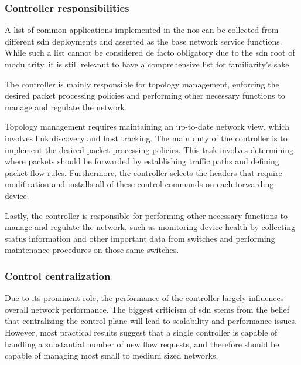 \subsubsection{Controller responsibilities}
A list of common applications implemented in the \gls{nos} can be collected from different \gls{sdn} deployments and asserted as the base network service functions\cite{kreutz_software-defined_2015}. While such a list cannot be considered de facto obligatory due to the \gls{sdn} root of modularity, it is still relevant to have a comprehensive list for familiarity's sake.

The controller is mainly responsible for topology management, enforcing the desired packet processing policies and performing other necessary functions to manage and regulate the network\cite{peterson_software-defined_2021}\cite{latif_comprehensive_2020}\cite{bifulco_survey_2018}\cite{kreutz_software-defined_2015}\cite{zhu_sdn_2020}. 

Topology management requires maintaining an up-to-date network view, which involves link discovery and host tracking.
The main duty of the controller is to implement the desired packet processing policies. This task involves determining where packets should be forwarded by establishing traffic paths and defining packet flow rules. Furthermore, the controller selects the headers that require modification and installs all of these control commands on each forwarding device.

Lastly, the controller is responsible for performing other necessary functions to manage and regulate the network, such as monitoring device health by collecting status information and other important data from switches and performing maintenance procedures on those same switches.

\subsubsection{Control centralization}
Due to its prominent role, the performance of the controller largely influences overall network performance. The biggest criticism of \gls{sdn} stems from the belief that centralizing the control plane will lead to scalability and performance issues. However, most practical results suggest that a single controller is capable of handling a substantial number of new flow requests, and therefore should be capable of managing most small to medium sized networks\cite{nunes_survey_2014}\cite{zhu_sdn_2020}.

